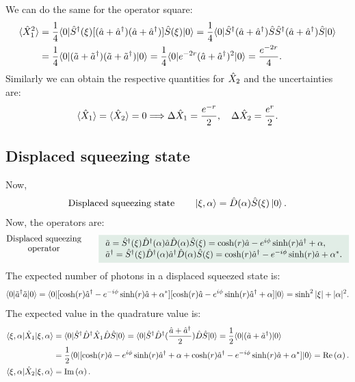 We can do the same for the operator square:
\begin{align*}
    \langle\hat{X}_1^2\rangle&=\frac{1}{4}\langle0|\hat{S}^\dagger(\xi)[(\hat{a}+\hat{a}^\dagger)(\hat{a}+\hat{a}^\dagger)]\hat{S}(\xi)|0\rangle=\frac{1}{4}\langle0|\hat{S}^\dagger(\hat{a}+\hat{a}^\dagger)\hat{S}\hat{S}^\dagger(\hat{a}+\hat{a}^\dagger)\hat{S}|0\rangle\\
    &=\frac{1}{4}\langle0|(\tilde{a}+\tilde{a}^\dagger)(\tilde{a}+\tilde{a}^\dagger)|0\rangle=\frac{1}{4}\langle0|e^{-2r}(\hat{a}+\hat{a}^\dagger)^2|0\rangle=\frac{e^{-2r}}{4}.
\end{align*}
Similarly we can obtain the respective quantities for $\hat{X}_2$ and the uncertainties are:
\begin{align*}
    \langle\hat{X}_1\rangle=\langle\hat{X}_2\rangle=0 \Longrightarrow
    \Delta\hat{X}_1=\frac{e^{-r}}{2},\quad\Delta\hat{X}_2=\frac{e^r}{2}.
\end{align*}
\subsection{Displaced squeezing state}
Now,
\begin{align*}
    \shortstack{Displaced squeezing state}\qquad\ket{\xi,\alpha}=\hD(\alpha)\hS(\xi)\ket{0}.
\end{align*}
Now, the operators are:
\begin{align}
    \shortstack{Displaced squeezing\\operator}\qquad\highlight{
    \begin{array}{l}
        \tilde{a}=\hS^\dagger(\xi)\hD^\dagger(\alpha)\ha\hD(\alpha)\hS(\xi)=\cosh(r)\ha-e^{i\phi}\sinh(r)\ha^\dagger+\alpha,\\
        \tilde{a}^\dagger=\hS^\dagger(\xi)\hD^\dagger(\alpha)\ha^\dagger\hD(\alpha)\hS(\xi)=\cosh(r)\ha^\dagger-e^{-i\phi}\sinh(r)\ha+\alpha^*.
    \end{array}}
\end{align}
The expected number of photons in a displaced squeezed state is:
\begin{align*}
    \langle0|\tilde{a}^\dagger\tilde{a}|0\rangle=\langle0|[\cosh(r)\hat{a}^\dagger-e^{-i\phi}\sinh(r)\hat{a}+\alpha^*][\cosh(r)\hat{a}-e^{i\phi}\sinh(r)\hat{a}^\dagger+\alpha]|0\rangle=\sinh^2|\xi|+|\alpha|^2.
\end{align*}
The expected value in the quadrature value is:
\begin{align*}
    \langle\xi,\alpha|\hat{X}_1|\xi,\alpha\rangle&=\langle0|\hat{S}^\dagger\hat{D}^\dagger\hat{X}_1\hat{D}\hat{S}|0\rangle=\langle0|\hat{S}^\dagger\hat{D}^\dagger(\frac{\hat{a}+\hat{a}^\dagger}{2})\hat{D}\hat{S}|0\rangle=
    \frac{1}{2}\langle0|(\tilde{a}+\tilde{a}^\dagger)|0\rangle\\
    &=\frac{1}{2}\langle0|[\cosh(r)\hat{a}-e^{i\phi}\sinh(r)\hat{a}^\dagger+\alpha+\cosh(r)\hat{a}^\dagger-e^{-i\phi}\sinh(r)\hat{a}+\alpha^*]|0\rangle=\text{Re}\left(\alpha\right).\\
    \langle\xi,\alpha|\hat{X}_2|\xi,\alpha\rangle&=\text{Im}\left(\alpha\right).
\end{align*}


